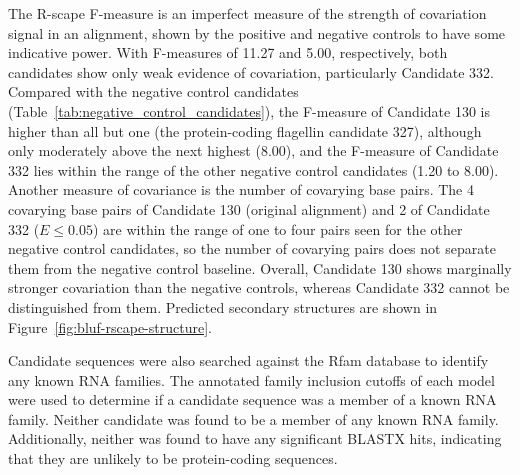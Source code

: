 The R-scape F-measure is an imperfect measure of the strength of covariation signal in an alignment, shown by the positive and negative controls to have some indicative power.
With F-measures of 11.27 and 5.00, respectively, both candidates show only weak evidence of covariation, particularly Candidate 332.
Compared with the negative control candidates (Table~\ref{tab:negative_control_candidates}), the F-measure of Candidate 130 is higher than all but one (the protein-coding flagellin candidate 327), although only moderately above the next highest (8.00), and the F-measure of Candidate 332 lies within the range of the other negative control candidates (1.20 to 8.00).
Another measure of covariance is the number of covarying base pairs.
The 4 covarying base pairs of Candidate 130 (original alignment) and 2 of Candidate 332 ($E \le 0.05$) are within the range of one to four pairs seen for the other negative control candidates, so the number of covarying pairs does not separate them from the negative control baseline.
Overall, Candidate 130 shows marginally stronger covariation than the negative controls, whereas Candidate 332 cannot be distinguished from them.
Predicted secondary structures are shown in Figure~\ref{fig:bluf-rscape-structure}.

Candidate sequences were also searched against the Rfam database \citep{Ontiveros-Palacios2025} to identify any known RNA families.
The annotated family inclusion cutoffs of each model were used to determine if a candidate sequence was a member of a known RNA family.
Neither candidate was found to be a member of any known RNA family.
Additionally, neither was found to have any significant BLASTX hits, indicating that they are unlikely to be protein-coding sequences.

